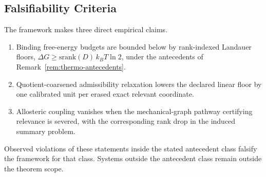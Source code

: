 \subsection{Falsifiability Criteria}

The framework makes three direct empirical claims.
\begin{enumerate}
\item Binding free-energy budgets are bounded below by rank-indexed Landauer floors, $\Delta G \ge \mathrm{srank}(D)\,k_B T\ln 2$, under the antecedents of Remark~\ref{rem:thermo-antecedents}.
\item Quotient-coarsened admissibility relaxation lowers the declared linear floor by one calibrated unit per erased exact relevant coordinate.
\item Allosteric coupling vanishes when the mechanical-graph pathway certifying relevance is severed, with the corresponding rank drop in the induced summary problem.
\end{enumerate}

Observed violations of these statements inside the stated antecedent class falsify the framework for that class. Systems outside the antecedent class remain outside the theorem scope.
